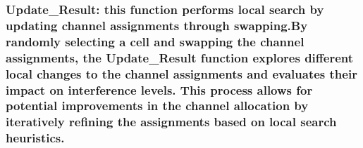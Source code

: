 \documentclass[11pt]{article}
\begin{document}
\begin{itemize}
{  \subsubsection{\texorpdfstring{ Update\_Result: this function performs
  local search by updating channel assignments through swapping.By
  randomly selecting a cell and swapping the channel assignments, the
  Update\_Result function explores different local changes to the
  channel assignments and evaluates their impact on interference levels.
  This process allows for potential improvements in the channel
  allocation by iteratively refining the assignments based on local
  search
  heuristics.}{  Update\_Result: this function performs local search by updating channel assignments through swapping.By randomly selecting a cell and swapping the channel assignments, the Update\_Result function explores different local changes to the channel assignments and evaluates their impact on interference levels. This process allows for potential improvements in the channel allocation by iteratively refining the assignments based on local search heuristics.}}\label{update_result-this-function-performs-local-search-by-updating-channel-assignments-through-swapping.by-randomly-selecting-a-cell-and-swapping-the-channel-assignments-the-update_result-function-explores-different-local-changes-to-the-channel-assignments-and-evaluates-their-impact-on-interference-levels.-this-process-allows-for-potential-improvements-in-the-channel-allocation-by-iteratively-refining-the-assignments-based-on-local-search-heuristics.}}
\end{itemize}
\end{document}
